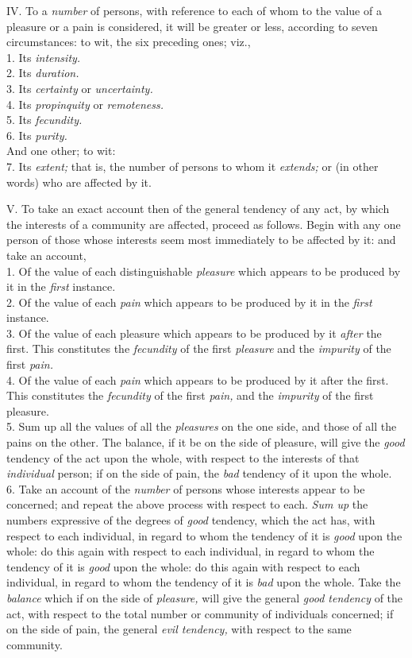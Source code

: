 \documentclass[12pt]{report}
\begin{document}
IV. To a \emph{number} of persons, with reference to each of whom to the
value of a pleasure or a pain is considered, it will be greater or less,
according to seven circumstances: to wit, the six preceding ones;
viz.,\\
1. Its \emph{intensity.} \emph{\\
}2. Its \emph{duration.} \emph{\\
}3. Its \emph{certainty} or \emph{uncertainty.} \emph{\\
}4. Its \emph{propinquity} or \emph{remoteness.} \emph{\\
}5. Its \emph{fecundity.} \emph{\\
}6. Its \emph{purity.} \emph{\\
}And one other; to wit:\\
7. Its \emph{extent;} that is, the number of persons to whom it
\emph{extends;} or (in other words) who are affected by it.

V. To take an exact account then of the general tendency of any act, by
which the interests of a community are affected, proceed as follows.
Begin with any one person of those whose interests seem most immediately
to be affected by it: and take an account,\\
1. Of the value of each distinguishable \emph{pleasure} which appears to
be produced by it in the \emph{first} instance.\\
2. Of the value of each \emph{pain} which appears to be produced by it
in the \emph{first} instance.\\
3. Of the value of each pleasure which appears to be produced by it
\emph{after} the first. This constitutes the \emph{fecundity} of the
first \emph{pleasure} and the \emph{impurity} of the first \emph{pain.}
\emph{\\
}4. Of the value of each \emph{pain} which appears to be produced by it
after the first. This constitutes the \emph{fecundity} of the first
\emph{pain,} and the \emph{impurity} of the first pleasure.\\
5. Sum up all the values of all the \emph{pleasures} on the one side,
and those of all the pains on the other. The balance, if it be on the
side of pleasure, will give the \emph{good} tendency of the act upon the
whole, with respect to the interests of that \emph{individual} person;
if on the side of pain, the \emph{bad} tendency of it upon the whole.\\
6. Take an account of the \emph{number} of persons whose interests
appear to be concerned; and repeat the above process with respect to
each. \emph{Sum up} the numbers expressive of the degrees of \emph{good}
tendency, which the act has, with respect to each individual, in regard
to whom the tendency of it is \emph{good} upon the whole: do this again
with respect to each individual, in regard to whom the tendency of it is
\emph{good} upon the whole: do this again with respect to each
individual, in regard to whom the tendency of it is \emph{bad} upon the
whole. Take the \emph{balance} which if on the side of \emph{pleasure,}
will give the general \emph{good tendency} of the act, with respect to
the total number or community of individuals concerned; if on the side
of pain, the general \emph{evil tendency,} with respect to the same
community.
\end{document}
